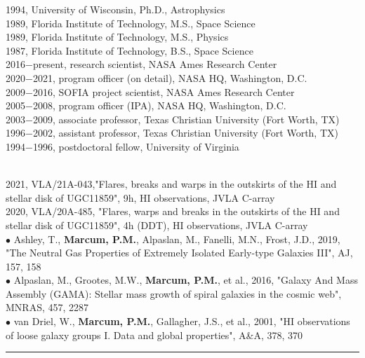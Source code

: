 1994, University of Wisconsin, Ph.D., Astrophysics\\
1989, Florida Institute of Technology, M.S., Space Science\\
1989, Florida Institute of Technology, M.S., Physics\\
1987, Florida Institute of Technology, B.S., Space Science
\mySectionSpacing
{}\\
2016$-$present, research scientist, NASA Ames Research Center\\
2020$-$2021, program officer (on detail), NASA HQ, Washington, D.C.\\
2009$-$2016, SOFIA project scientist, NASA Ames Research Center\\
2005$-$2008, program officer (IPA), NASA HQ, Washington, D.C.\\
2003$-$2009, associate professor, Texas Christian University (Fort Worth, TX)\\
1996$-$2002, assistant professor, Texas Christian University (Fort Worth, TX)\\
1994$-$1996, postdoctoral fellow, University of Virginia
\par \vspace{-0.5em}
\\
2021, VLA/21A-043,"Flares, breaks and warps in the outskirts of the HI and stellar disk of UGC11859", 9h, HI observations, JVLA C-array\\
2020, VLA/20A-485, "Flares, warps and breaks in the outskirts of the HI and stellar disk of UGC11859", 4h (DDT), HI observations, JVLA C-array
\mySectionSpacing
{}\\
{\scriptsize{$\bullet$}} Ashley, T., \textbf{Marcum, P.M.}, Alpaslan, M., Fanelli, M.N., Frost, J.D., 2019, "The Neutral Gas Properties of Extremely Isolated Early-type Galaxies III", AJ, 157, 158\\
{\scriptsize{$\bullet$}} Alpaslan, M., Grootes, M.W., \textbf{Marcum, P.M.}, et al., 2016, "Galaxy And Mass Assembly (GAMA): Stellar mass growth of spiral galaxies in the cosmic web", MNRAS, 457, 2287\\
{\scriptsize{$\bullet$}} van Driel, W., \textbf{Marcum, P.M.}, Gallagher, J.S., et al., 2001, "HI observations of loose galaxy groups I. Data and global properties", A\&A, 378, 370
\medskip \hrule \vspace{5pt} \medskip